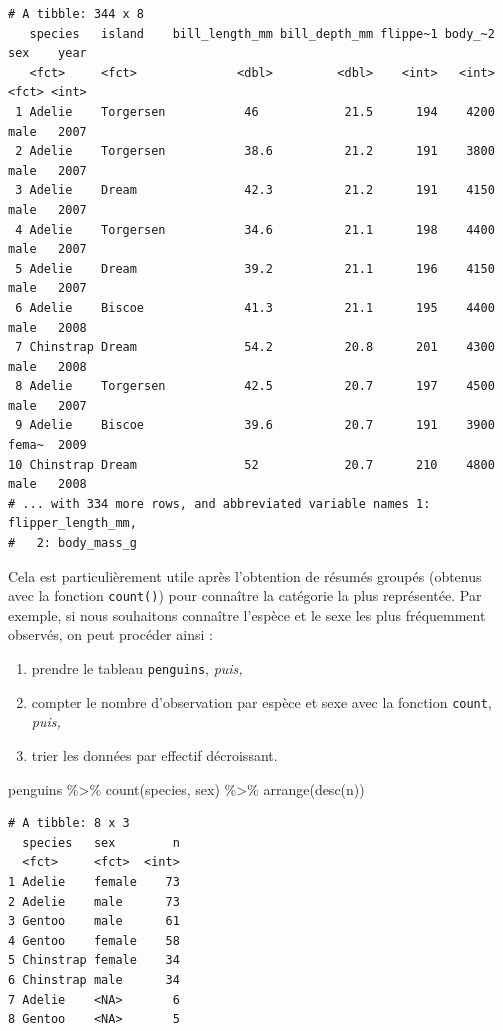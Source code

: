 \documentclass[
  letterpaper,
  DIV=11,
  numbers=noendperiod]{scrreprt}
\newenvironment{Shaded}{\begin{snugshade}}{\end{snugshade}}
\newcommand{\FunctionTok}[1]{\textcolor[rgb]{0.28,0.35,0.67}{#1}}
\newcommand{\NormalTok}[1]{\textcolor[rgb]{0.00,0.23,0.31}{#1}}
\newcommand{\SpecialCharTok}[1]{\textcolor[rgb]{0.37,0.37,0.37}{#1}}
\providecommand{\tightlist}{%
  \setlength{\itemsep}{0pt}\setlength{\parskip}{0pt}}\usepackage{longtable,booktabs,array}
\begin{document}
\begin{verbatim}
# A tibble: 344 x 8
   species   island    bill_length_mm bill_depth_mm flippe~1 body_~2 sex    year
   <fct>     <fct>              <dbl>         <dbl>    <int>   <int> <fct> <int>
 1 Adelie    Torgersen           46            21.5      194    4200 male   2007
 2 Adelie    Torgersen           38.6          21.2      191    3800 male   2007
 3 Adelie    Dream               42.3          21.2      191    4150 male   2007
 4 Adelie    Torgersen           34.6          21.1      198    4400 male   2007
 5 Adelie    Dream               39.2          21.1      196    4150 male   2007
 6 Adelie    Biscoe              41.3          21.1      195    4400 male   2008
 7 Chinstrap Dream               54.2          20.8      201    4300 male   2008
 8 Adelie    Torgersen           42.5          20.7      197    4500 male   2007
 9 Adelie    Biscoe              39.6          20.7      191    3900 fema~  2009
10 Chinstrap Dream               52            20.7      210    4800 male   2008
# ... with 334 more rows, and abbreviated variable names 1: flipper_length_mm,
#   2: body_mass_g
\end{verbatim}

Cela est particulièrement utile après l'obtention de résumés groupés
(obtenus avec la fonction \texttt{count()}) pour connaître la catégorie
la plus représentée. Par exemple, si nous souhaitons connaître l'espèce
et le sexe les plus fréquemment observés, on peut procéder ainsi :

\begin{enumerate}
\def\labelenumi{\arabic{enumi}.}
\tightlist
\item
  prendre le tableau \texttt{penguins}, \emph{puis,}
\item
  compter le nombre d'observation par espèce et sexe avec la fonction
  \texttt{count}, \emph{puis,}
\item
  trier les données par effectif décroissant.
\end{enumerate}

\begin{Shaded}
\begin{Highlighting}[]
\NormalTok{penguins }\SpecialCharTok{\%\textgreater{}\%}
  \FunctionTok{count}\NormalTok{(species, sex) }\SpecialCharTok{\%\textgreater{}\%}
  \FunctionTok{arrange}\NormalTok{(}\FunctionTok{desc}\NormalTok{(n))}
\end{Highlighting}
\end{Shaded}

\begin{verbatim}
# A tibble: 8 x 3
  species   sex        n
  <fct>     <fct>  <int>
1 Adelie    female    73
2 Adelie    male      73
3 Gentoo    male      61
4 Gentoo    female    58
5 Chinstrap female    34
6 Chinstrap male      34
7 Adelie    <NA>       6
8 Gentoo    <NA>       5
\end{verbatim}
\end{document}
